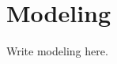 \documentclass[a4paper,11pt,oneside,openany,fleqn]{jsbook}
\begin{document}
    \chapter{Modeling}
        Write modeling here.
\end{document}
